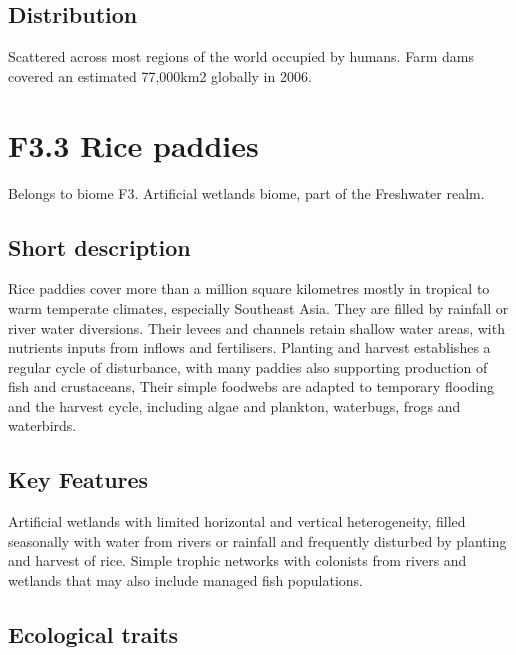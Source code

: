\documentclass[
  letterpaper,
  DIV=11,
  numbers=noendperiod]{scrartcl}
\begin{document}
\subsection{Distribution}\label{distribution-18}

Scattered across most regions of the world occupied by humans. Farm dams
covered an estimated 77,000km2 globally in 2006.

\section{F3.3 Rice paddies}\label{f3.3-rice-paddies}

Belongs to biome F3. Artificial wetlands biome, part of the Freshwater
realm.

\subsection{Short description}\label{short-description-19}

Rice paddies cover more than a million square kilometres mostly in
tropical to warm temperate climates, especially Southeast Asia. They are
filled by rainfall or river water diversions. Their levees and channels
retain shallow water areas, with nutrients inputs from inflows and
fertilisers. Planting and harvest establishes a regular cycle of
disturbance, with many paddies also supporting production of fish and
crustaceans, Their simple foodwebs are adapted to temporary flooding and
the harvest cycle, including algae and plankton, waterbugs, frogs and
waterbirds.

\subsection{Key Features}\label{key-features-19}

Artificial wetlands with limited horizontal and vertical heterogeneity,
filled seasonally with water from rivers or rainfall and frequently
disturbed by planting and harvest of rice. Simple trophic networks with
colonists from rivers and wetlands that may also include managed fish
populations.

\subsection{Ecological traits}\label{ecological-traits-19}
\end{document}
